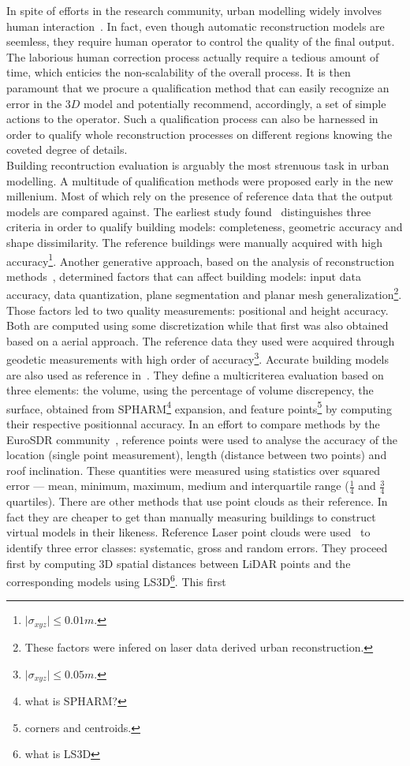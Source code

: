 \documentclass[../main.tex]{subfiles}
\begin{document}
    In spite of efforts in the research community, urban modelling widely involves human interaction~\cite{Musialski2012}. In fact, even though automatic reconstruction models are seemless, they require human operator to control the quality of the final output. The laborious human correction process actually require a tedious amount of time, which enticies the non-scalability of the overall process. It is then paramount that we procure a qualification method that can easily recognize an error in the $3D$ model and potentially recommend, accordingly, a set of simple actions to the operator. Such a qualification process can also be harnessed in order to qualify whole reconstruction processes on different regions knowing the coveted degree of details.\\

    Building recontruction evaluation is arguably the most strenuous task in urban modelling. A multitude of qualification methods were proposed early in the new millenium. Most of which rely on the presence of reference data that the output models are compared against. The earliest study found~\cite{Henricsson1997} distinguishes three criteria in order to qualify building models: completeness, geometric accuracy and shape dissimilarity. The reference buildings were manually acquired with high accuracy\footnote{$ \vert \sigma_{xyz} \vert \leq 0.01 m$.}. Another generative approach, based on the analysis of reconstruction methods~\cite{Voegtle2003}, determined factors that can affect building models: input data accuracy, data quantization, plane segmentation and planar mesh generalization\footnote{These factors were infered on laser data derived urban reconstruction.}. Those factors led to two quality measurements: positional and height accuracy. Both are computed using some discretization while that first was also obtained based on a aerial approach. The reference data they used were acquired through geodetic measurements with high order of accuracy\footnote{$ \vert \sigma_{xyz} \vert \leq 0.05 m $.}. Accurate building models are also used as reference in~\cite{Zeng2014}. They define a multicriterea evaluation based on three elements: the volume, using the percentage of volume discrepency, the surface, obtained from SPHARM\footnote{what is SPHARM?} expansion, and feature points\footnote{corners and centroids.} by computing their respective positionnal accuracy. In an effort to compare methods by the EuroSDR community~\cite{Kaartinen2005}, reference points were used to analyse the accuracy of the location (single point measurement), length (distance between two points) and roof inclination. These quantities were measured using statistics over squared error --- mean, minimum, maximum, medium and interquartile range ($\frac{1}{4}$ and $\frac{3}{4}$ quartiles). There are other methods that use point clouds as their reference. In fact they are cheaper to get than manually measuring buildings to construct virtual models in their likeness. Reference Laser point clouds were used~\cite{Akca2010} to identify three error classes: systematic, gross and random errors. They proceed first by computing 3D spatial distances between LiDAR points and the corresponding models using LS3D\footnote{what is LS3D}. This first 
\end{document}
